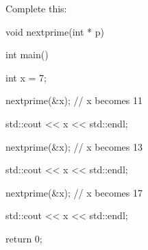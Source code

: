 Complete this:



\begin{consolethree}[escapeinside=||]

void nextprime(int * p)

{



}



int main()

{   

    int x = 7;

    nextprime(&x); // x becomes 11

    std::cout << x << std::endl;

    nextprime(&x); // x becomes 13

    std::cout << x << std::endl;

    nextprime(&x); // x becomes 17

    std::cout << x << std::endl;

    return 0;

}

\end{consolethree}

